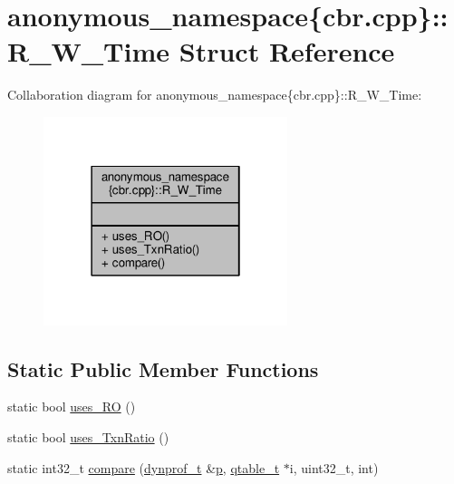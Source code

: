 \hypertarget{structanonymous__namespace_02cbr_8cpp_03_1_1R__W__Time}{\section{anonymous\-\_\-namespace\{cbr.\-cpp\}\-:\-:R\-\_\-\-W\-\_\-\-Time Struct Reference}
\label{structanonymous__namespace_02cbr_8cpp_03_1_1R__W__Time}
}


Collaboration diagram for anonymous\-\_\-namespace\{cbr.\-cpp\}\-:\-:R\-\_\-\-W\-\_\-\-Time\-:
\nopagebreak
\begin{figure}[H]
\begin{center}
\leavevmode
\includegraphics[width=202pt]{structanonymous__namespace_02cbr_8cpp_03_1_1R__W__Time__coll__graph}
\end{center}
\end{figure}
\subsection*{Static Public Member Functions}
\begin{DoxyCompactItemize}
\item 
static bool \hyperlink{structanonymous__namespace_02cbr_8cpp_03_1_1R__W__Time_a206d971c9af055d3bde331a3d3295dcf}{uses\-\_\-\-R\-O} ()
\item 
static bool \hyperlink{structanonymous__namespace_02cbr_8cpp_03_1_1R__W__Time_a1d2481eb5cf90ab47e80ff1fd5ab5226}{uses\-\_\-\-Txn\-Ratio} ()
\item 
static int32\-\_\-t \hyperlink{structanonymous__namespace_02cbr_8cpp_03_1_1R__W__Time_a10f287c5b3d707dd2f96d01e626bb48b}{compare} (\hyperlink{structstm_1_1dynprof__t}{dynprof\-\_\-t} \&\hyperlink{counted__ptr_8hpp_a5c9f59d7c24e3fd6ceae319a968fc3e0}{p}, \hyperlink{structstm_1_1qtable__t}{qtable\-\_\-t} $\ast$i, uint32\-\_\-t, int)
\end{DoxyCompactItemize}


